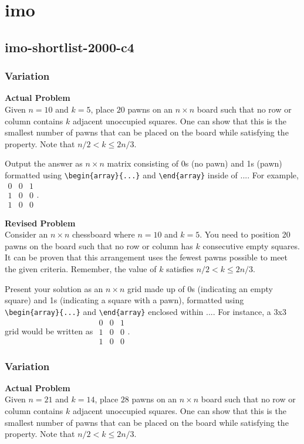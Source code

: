 \section{imo}
\subsection{imo-shortlist-2000-c4}
\subsubsection{Variation}
\textbf{Actual Problem}\\
Given $n=10$ and $k=5$, place $20$ pawns on an $n \times n$ board such that no row or column contains $k$ adjacent unoccupied squares.
One can show that this is the smallest number of pawns that can be placed on the board while satisfying the property.
Note that $n/2 < k \leq 2n/3$.

Output the answer as $n \times n$ matrix consisting of 0s (no pawn) and 1s (pawn) formatted using \verb|\begin{array}{...}| and \verb|\end{array}| inside of $\boxed{...}$. For example, $\boxed{\begin{array}{ccc}0 & 0 & 1 \\ 1 & 0 & 0 \\ 1 & 0 & 0\end{array}}$.

\textbf{Revised Problem}\\
Consider an \( n \times n \) chessboard where \( n = 10 \) and \( k = 5 \). You need to position 20 pawns on the board such that no row or column has \( k \) consecutive empty squares. It can be proven that this arrangement uses the fewest pawns possible to meet the given criteria.
Remember, the value of \( k \) satisfies \( n/2 < k \leq 2n/3 \).

Present your solution as an \( n \times n \) grid made up of 0s (indicating an empty square) and 1s (indicating a square with a pawn), formatted using \verb|\begin{array}{...}| and \verb|\end{array}| enclosed within $\boxed{...}$. For instance, a 3x3 grid would be written as $\boxed{\begin{array}{ccc}0 & 0 & 1 \\ 1 & 0 & 0 \\ 1 & 0 & 0\end{array}}$.

\subsubsection{Variation}
\textbf{Actual Problem}\\
Given $n=21$ and $k=14$, place $28$ pawns on an $n \times n$ board such that no row or column contains $k$ adjacent unoccupied squares.
One can show that this is the smallest number of pawns that can be placed on the board while satisfying the property.
Note that $n/2 < k \leq 2n/3$.


